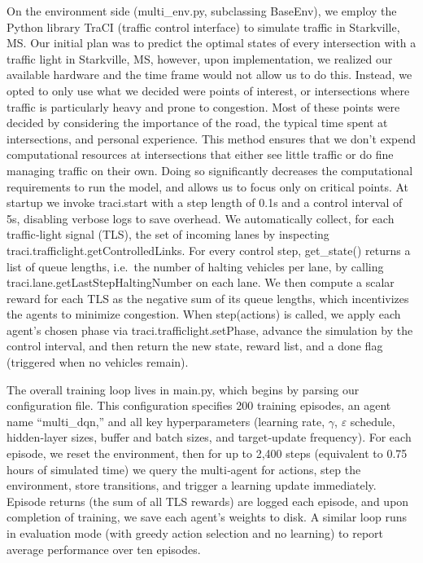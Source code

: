 \documentclass[conference]{IEEEtran}
\begin{document}
On the environment side (multi\_env.py, subclassing BaseEnv), we employ the Python library TraCI (traffic control interface) to simulate traffic in Starkville, MS. Our initial plan was to predict the optimal states of every intersection with a traffic light in Starkville, MS, however, upon implementation, we realized our available hardware and the time frame would not allow us to do this. Instead, we opted to only use what we decided were points of interest, or intersections where traffic is particularly heavy and prone to congestion. Most of these points were decided by considering the importance of the road, the typical time spent at intersections, and personal experience. This method ensures that we don't expend computational resources at intersections that either see little traffic or do fine managing traffic on their own. Doing so significantly decreases the computational requirements to run the model, and allows us to focus only on critical points. At startup we invoke traci.start with a step length of 0.1s and a control interval of 5s, disabling verbose logs to save overhead. We automatically collect, for each traffic‐light signal (TLS), the set of incoming lanes by inspecting traci.trafficlight.getControlledLinks. For every control step, get\_state() returns a list of queue lengths, i.e.\ the number of halting vehicles per lane, by calling traci.lane.getLastStepHaltingNumber on each lane. We then compute a scalar reward for each TLS as the negative sum of its queue lengths, which incentivizes the agents to minimize congestion. When step(actions) is called, we apply each agent’s chosen phase via traci.trafficlight.setPhase, advance the simulation by the control interval, and then return the new state, reward list, and a done flag (triggered when no vehicles remain).

The overall training loop lives in main.py, which begins by parsing our configuration file. This configuration specifies 200 training episodes, an agent name ``multi\_dqn,'' and all key hyperparameters (learning rate, $\gamma$, $\varepsilon$ schedule, hidden‐layer sizes, buffer and batch sizes, and target‐update frequency). For each episode, we reset the environment, then for up to 2,400 steps (equivalent to 0.75 hours of simulated time) we query the multi‐agent for actions, step the environment, store transitions, and trigger a learning update immediately. Episode returns (the sum of all TLS rewards) are logged each episode, and upon completion of training, we save each agent’s weights to disk. A similar loop runs in evaluation mode (with greedy action selection and no learning) to report average performance over ten episodes.
\end{document}
